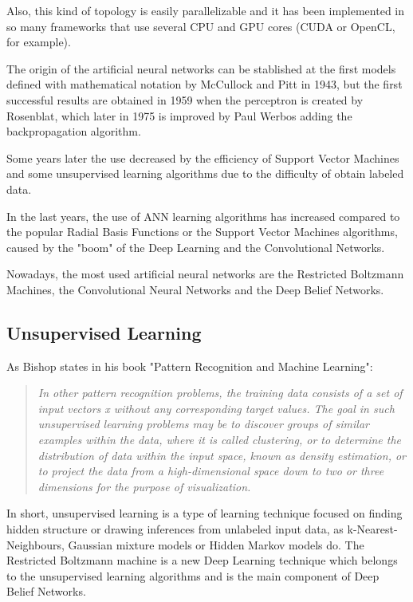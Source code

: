 \documentclass[a4paper,openany,oneside,12pt]{book}
\begin{document}
Also, this kind of topology is easily parallelizable and it has been implemented in so many frameworks that use several CPU and GPU cores (CUDA or OpenCL, for example).

The origin of the artificial neural networks can be stablished at the first models defined with mathematical notation by McCullock and Pitt in 1943, but the first successful results are obtained in 1959 when the perceptron is created by Rosenblat, which later in 1975 is improved by Paul Werbos adding the backpropagation algorithm.

Some years later the use decreased by the efficiency of Support Vector Machines and some unsupervised learning algorithms due to the difficulty of obtain labeled data.

In the last years, the use of ANN learning algorithms has increased compared to the popular Radial Basis Functions or the Support Vector Machines algorithms, caused by the "boom" of the Deep Learning and the Convolutional Networks.

Nowadays, the most used artificial neural networks are the Restricted Boltzmann Machines, the Convolutional Neural Networks and the Deep Belief Networks.

\subsection{Unsupervised Learning}
As Bishop states in his book "Pattern Recognition and Machine Learning":
\begin{quote}
\em In other pattern recognition problems, the training data consists of a set of input vectors x without any corresponding target values. The goal in such unsupervised learning problems may be to discover groups of similar examples within the data, where it is called clustering, or to determine the distribution of data within the input space, known as density estimation, or to project the data from a high-dimensional space down to two or three dimensions for the purpose of visualization.\cite{Bishop}
\end{quote}

In short, unsupervised learning is a type of learning technique focused on finding hidden structure or drawing inferences from unlabeled input data, as k-Nearest-Neighbours, Gaussian mixture models or Hidden Markov models do. The Restricted Boltzmann machine is a new Deep Learning technique which belongs to the unsupervised learning algorithms and is the main component of Deep Belief Networks.
\end{document}
